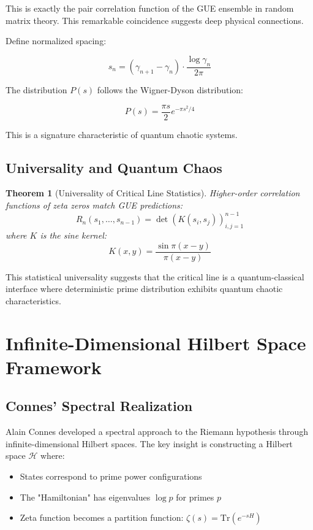\documentclass[12pt]{article}
\newtheorem{theorem}{Theorem}[section]
\begin{document}
This is exactly the pair correlation function of the GUE ensemble in random matrix theory. This remarkable coincidence suggests deep physical connections.

Define normalized spacing:

$$s_n = (\gamma_{n+1} - \gamma_n) \cdot \frac{\log\gamma_n}{2\pi}$$

The distribution $P(s)$ follows the Wigner-Dyson distribution:

$$P(s) = \frac{\pi s}{2} e^{-\pi s^2/4}$$

This is a signature characteristic of quantum chaotic systems.

\subsection{Universality and Quantum Chaos}

\begin{theorem}[Universality of Critical Line Statistics]
Higher-order correlation functions of zeta zeros match GUE predictions:
$$R_n(s_1, \ldots, s_{n-1}) = \det(K(s_i, s_j))_{i,j=1}^{n-1}$$
where $K$ is the sine kernel:
$$K(x,y) = \frac{\sin\pi(x-y)}{\pi(x-y)}$$
\end{theorem}

This statistical universality suggests that the critical line is a quantum-classical interface where deterministic prime distribution exhibits quantum chaotic characteristics.

\section{Infinite-Dimensional Hilbert Space Framework}

\subsection{Connes' Spectral Realization}

Alain Connes developed a spectral approach to the Riemann hypothesis through infinite-dimensional Hilbert spaces. The key insight is constructing a Hilbert space $\mathcal{H}$ where:

\begin{itemize}
\item States correspond to prime power configurations
\item The "Hamiltonian" has eigenvalues $\log p$ for primes $p$
\item Zeta function becomes a partition function: $\zeta(s) = \text{Tr}(e^{-sH})$
\end{itemize}
\end{document}
